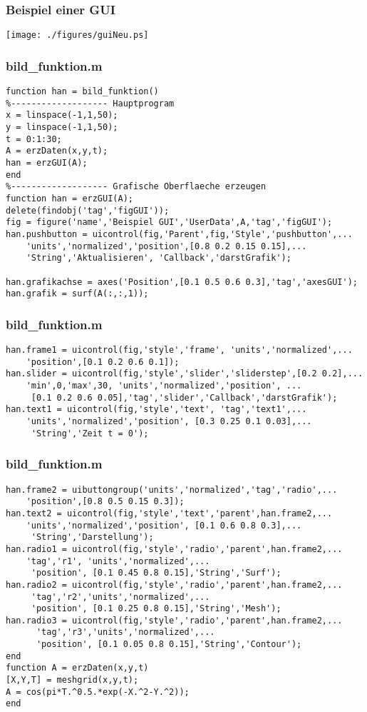 % 
%
\begin{frame}[fragile]\frametitle{Beispiel einer GUI}
\texttt{[image: ./figures/guiNeu.ps]}
\end{frame}
% 
%
\begin{frame}[fragile]\frametitle{bild\_funktion.m}
\begin{lstlisting}
function han = bild_funktion()
%------------------- Hauptprogram
x = linspace(-1,1,50);
y = linspace(-1,1,50);
t = 0:1:30;
A = erzDaten(x,y,t);
han = erzGUI(A);
end
%------------------- Grafische Oberflaeche erzeugen
function han = erzGUI(A);
delete(findobj('tag','figGUI'));
fig = figure('name','Beispiel GUI','UserData',A,'tag','figGUI');
han.pushbutton = uicontrol(fig,'Parent',fig,'Style','pushbutton',...
    'units','normalized','position',[0.8 0.2 0.15 0.15],...
    'String','Aktualisieren', 'Callback','darstGrafik');

han.grafikachse = axes('Position',[0.1 0.5 0.6 0.3],'tag','axesGUI');
han.grafik = surf(A(:,:,1));
\end{lstlisting}
\end{frame}
% 
%
\begin{frame}[fragile]\frametitle{bild\_funktion.m}
\begin{lstlisting}han.frame1 = uicontrol(fig,'style','frame', 'units','normalized',...
    'position',[0.1 0.2 0.6 0.1]);
han.slider = uicontrol(fig,'style','slider','sliderstep',[0.2 0.2],...
    'min',0,'max',30, 'units','normalized','position', ...
     [0.1 0.2 0.6 0.05],'tag','slider','Callback','darstGrafik');
han.text1 = uicontrol(fig,'style','text', 'tag','text1',...
    'units','normalized','position', [0.3 0.25 0.1 0.03],...
     'String','Zeit t = 0');
\end{lstlisting}
\end{frame}
% 
%
\begin{frame}[fragile]\frametitle{bild\_funktion.m}
\begin{lstlisting}
han.frame2 = uibuttongroup('units','normalized','tag','radio',...
    'position',[0.8 0.5 0.15 0.3]);
han.text2 = uicontrol(fig,'style','text','parent',han.frame2,...
    'units','normalized','position', [0.1 0.6 0.8 0.3],...
     'String','Darstellung');
han.radio1 = uicontrol(fig,'style','radio','parent',han.frame2,...
    'tag','r1', 'units','normalized',...
     'position', [0.1 0.45 0.8 0.15],'String','Surf');
han.radio2 = uicontrol(fig,'style','radio','parent',han.frame2,...
     'tag','r2','units','normalized',...
     'position', [0.1 0.25 0.8 0.15],'String','Mesh');
han.radio3 = uicontrol(fig,'style','radio','parent',han.frame2,...
      'tag','r3','units','normalized',...
      'position', [0.1 0.05 0.8 0.15],'String','Contour');
end
function A = erzDaten(x,y,t)
[X,Y,T] = meshgrid(x,y,t);
A = cos(pi*T.^0.5.*exp(-X.^2-Y.^2));
end
\end{lstlisting}
\end{frame}
